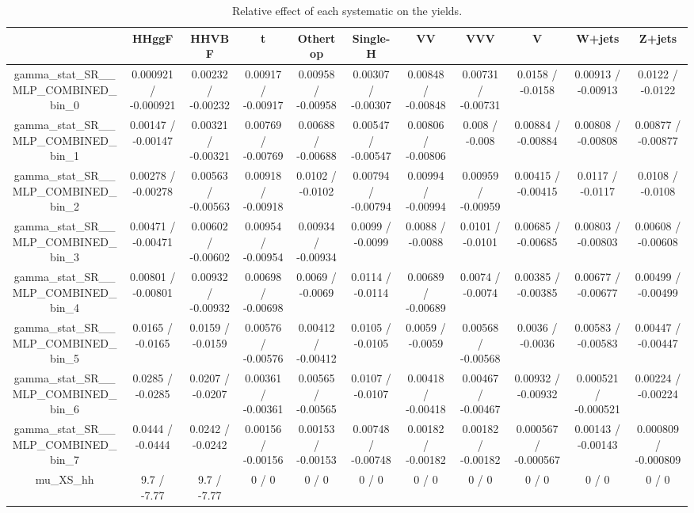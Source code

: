 \documentclass[10pt]{article}
\begin{document}
\begin{table}[htbp]
\begin{center}
\begin{tabular}{|c|c|c|c|c|c|c|c|c|c|c|}
\hline 
      & HHggF      & HHVBF      & t      & Othertop      & Single-H      & VV      & VVV      & V      & W+jets      & Z+jets \\ 
\hline 
  gamma_stat_SR__MLP_COMBINED_bin_0 & 0.000921 / -0.000921 & 0.00232 / -0.00232 & 0.00917 / -0.00917 & 0.00958 / -0.00958 & 0.00307 / -0.00307 & 0.00848 / -0.00848 & 0.00731 / -0.00731 & 0.0158 / -0.0158 & 0.00913 / -0.00913 & 0.0122 / -0.0122 \\ 
  gamma_stat_SR__MLP_COMBINED_bin_1 & 0.00147 / -0.00147 & 0.00321 / -0.00321 & 0.00769 / -0.00769 & 0.00688 / -0.00688 & 0.00547 / -0.00547 & 0.00806 / -0.00806 & 0.008 / -0.008 & 0.00884 / -0.00884 & 0.00808 / -0.00808 & 0.00877 / -0.00877 \\ 
  gamma_stat_SR__MLP_COMBINED_bin_2 & 0.00278 / -0.00278 & 0.00563 / -0.00563 & 0.00918 / -0.00918 & 0.0102 / -0.0102 & 0.00794 / -0.00794 & 0.00994 / -0.00994 & 0.00959 / -0.00959 & 0.00415 / -0.00415 & 0.0117 / -0.0117 & 0.0108 / -0.0108 \\ 
  gamma_stat_SR__MLP_COMBINED_bin_3 & 0.00471 / -0.00471 & 0.00602 / -0.00602 & 0.00954 / -0.00954 & 0.00934 / -0.00934 & 0.0099 / -0.0099 & 0.0088 / -0.0088 & 0.0101 / -0.0101 & 0.00685 / -0.00685 & 0.00803 / -0.00803 & 0.00608 / -0.00608 \\ 
  gamma_stat_SR__MLP_COMBINED_bin_4 & 0.00801 / -0.00801 & 0.00932 / -0.00932 & 0.00698 / -0.00698 & 0.0069 / -0.0069 & 0.0114 / -0.0114 & 0.00689 / -0.00689 & 0.0074 / -0.0074 & 0.00385 / -0.00385 & 0.00677 / -0.00677 & 0.00499 / -0.00499 \\ 
  gamma_stat_SR__MLP_COMBINED_bin_5 & 0.0165 / -0.0165 & 0.0159 / -0.0159 & 0.00576 / -0.00576 & 0.00412 / -0.00412 & 0.0105 / -0.0105 & 0.0059 / -0.0059 & 0.00568 / -0.00568 & 0.0036 / -0.0036 & 0.00583 / -0.00583 & 0.00447 / -0.00447 \\ 
  gamma_stat_SR__MLP_COMBINED_bin_6 & 0.0285 / -0.0285 & 0.0207 / -0.0207 & 0.00361 / -0.00361 & 0.00565 / -0.00565 & 0.0107 / -0.0107 & 0.00418 / -0.00418 & 0.00467 / -0.00467 & 0.00932 / -0.00932 & 0.000521 / -0.000521 & 0.00224 / -0.00224 \\ 
  gamma_stat_SR__MLP_COMBINED_bin_7 & 0.0444 / -0.0444 & 0.0242 / -0.0242 & 0.00156 / -0.00156 & 0.00153 / -0.00153 & 0.00748 / -0.00748 & 0.00182 / -0.00182 & 0.00182 / -0.00182 & 0.000567 / -0.000567 & 0.00143 / -0.00143 & 0.000809 / -0.000809 \\ 
  mu_XS_hh & 9.7 / -7.77 & 9.7 / -7.77 & 0 / 0 & 0 / 0 & 0 / 0 & 0 / 0 & 0 / 0 & 0 / 0 & 0 / 0 & 0 / 0 \\ 
\hline 
\end{tabular} 
\caption{Relative effect of each systematic on the yields.} 
\end{center} 
\end{table} 
\end{document}

